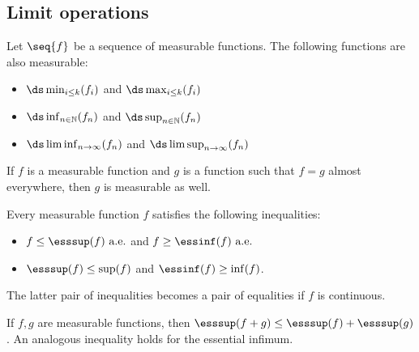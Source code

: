 \subsection{Limit operations}

    \begin{property}
        Let $\seq{f}$ be a sequence of measurable functions. The following functions are also measurable:
        \begin{itemize}
            \item $\ds\min_{i\leq k}(f_i)$ and $\ds\max_{i\leq k}(f_i)$
            \item $\ds\inf_{n\in\mathbb{N}}(f_n)$ and $\ds\sup_{n\in\mathbb{N}}(f_n)$
            \item $\ds\liminf_{n\rightarrow\infty}(f_n)$ and $\ds\limsup_{n\rightarrow\infty}(f_n)$
        \end{itemize}
    \end{property}

    \begin{property}
        If $f$ is a measurable function and $g$ is a function such that $f=g$ almost everywhere, then $g$ is measurable as well.
    \end{property}

    \begin{property}
        Every measurable function $f$ satisfies the following inequalities:
        \begin{itemize}
            \item $f\leq\esssup(f)\text{ a.e.}$ and $f\geq\essinf(f)\text{ a.e.}$
            \item $\esssup(f)\leq\sup(f)$ and $\essinf(f)\geq\inf(f)$.
        \end{itemize}
        The latter pair of inequalities becomes a pair of equalities if $f$ is continuous.
    \end{property}
    \begin{property}
        If $f,g$ are measurable functions, then $\esssup(f+g)\leq\esssup(f) + \esssup(g)$. An analogous inequality holds for the essential infimum.
    \end{property}

